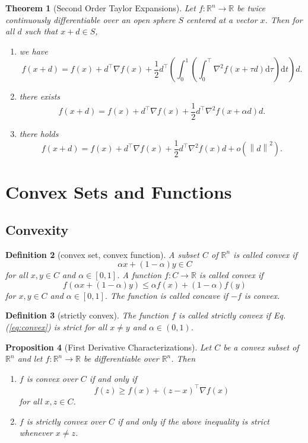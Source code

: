 \documentclass[12pt,a4paper]{article}
\numberwithin{equation}{section}
\theoremstyle{mystyle}
\newtheorem{definition}{Definition}[section]
\newtheorem{theorem}[definition]{Theorem}
\newtheorem{proposition}[definition]{Proposition}
\newcommand{\R}{\mathbb{R}}
\newcommand{\grad}{\nabla}
\renewcommand{\d}{\mathrm{d}}
\newcommand{\T}{\top}
\newcommand{\norm}[1]{\left\lVert #1 \right\rVert}
\begin{document}
	\begin{theorem}[Second Order Taylor Expansions]
		Let $f:\R^n \to \R$ be twice continuously differentiable over an open sphere $S$ centered at a vector $x$. Then for all $d$ such that $x+d\in S$,
		\begin{enumerate}
			\item we have
			$$
			f(x+d)=f(x)+d^\T \grad f(x) +\frac{1}{2}d^\T\left(\int_0^1\left(\int_0^\T \grad^2 f(x+\tau d)\d \tau\right)\d t\right)d.
			$$
			\item there exists
			$$
			f(x+d)=f(x)+d^\T \grad f(x)+\frac{1}{2}d^\T \grad^2 f(x+\alpha d)d.
			$$
			\item there holds
			$$
			f(x+d)=f(x)+d^\T \grad f(x)+\frac{1}{2}d^\T \grad^2 f(x)d+o(\norm{d}^2).
			$$
		\end{enumerate}
	\end{theorem}


	\section{Convex Sets and Functions}
	\subsection{Convexity}
	\begin{definition}[convex set, convex function]
		A subset $C$ of $\R^n$ is called \emph{convex} if 
		$$
		\alpha x+(1-\alpha)y\in C
		$$ for all $x,y\in C$ and $\alpha\in [0,1]$. A function $f:C\to \R$ is called \emph{convex} if 
		\begin{equation}
			f(\alpha x+(1-\alpha )y)\leq 
			\alpha f(x)+(1-\alpha)f(y)\label{eq:convex}
		\end{equation}
		for $x,y\in C$ and $\alpha\in [0,1]$. The function is called \emph{concave} if $-f$ is convex.
	\end{definition}
	\begin{definition}[strictly convex]
		The function $f$ is called \emph{strictly convex} if Eq.(\ref{eq:convex}) is strict for all $x\neq y$ and $\alpha\in(0,1)$.
	\end{definition}

	\begin{proposition}[First Derivative Characterizations]
		Let $C$ be a convex subset of $\R^n$ and let $f:\R^n \to \R$ be differentiable over $\R^n$. Then
		\begin{enumerate}
			\item $f$ is convex over $C$ if and only if
			\begin{equation}
				f(z)\geq f(x)+(z-x)^\T \grad f(x)
			\end{equation}
			for all $x,z\in C$.
			\item $f$ is strictly convex over $C$ if and only if the above inequality is strict whenever $x\neq z$.
		\end{enumerate}
	\end{proposition}
\end{document}

